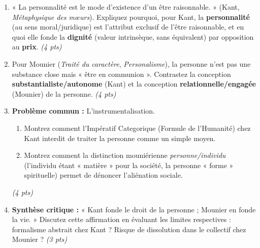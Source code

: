 \documentclass[11pt]{article}
\begin{document}
\begin{exercice}
\begin{enumerate}
    \item « La personnalité est le mode d'existence d'un être raisonnable. » (Kant, \textit{Métaphysique des mœurs}). Expliquez pourquoi, pour Kant, la \textbf{personnalité} (au sens moral/juridique) est l'attribut exclusif de l'être raisonnable, et en quoi elle fonde la \textbf{dignité} (valeur intrinsèque, sans équivalent) par opposition au \textbf{prix}. \textit{(4 pts)}
    \item Pour Mounier (\textit{Traité du caractère}, \textit{Personalisme}), la personne n'est pas une substance close mais « être en communion ». Contrastez la conception \textbf{substantialiste/autonome} (Kant) et la conception \textbf{relationnelle/engagée} (Mounier) de la personne. \textit{(4 pts)}
    \item \textbf{Problème commun :} L'instrumentalisation. 
    \begin{enumerate}
        \item Montrez comment l'Impératif Categorique (Formule de l'Humanité) chez Kant interdit de traiter la personne comme un simple moyen.
        \item Montrez comment la distinction mouniérienne \textit{personne/individu} (l'individu étant « matière » pour la société, la personne « forme » spirituelle) permet de dénoncer l'aliénation sociale.
    \end{enumerate}
    \textit{(4 pts)}
    \item \textbf{Synthèse critique :} « Kant fonde le droit de la personne ; Mounier en fonde la vie. » Discutez cette affirmation en évaluant les limites respectives : formalisme abstrait chez Kant ? Risque de dissolution dans le collectif chez Mounier ? \textit{(3 pts)}
\end{enumerate}
\end{exercice}
\end{document}
